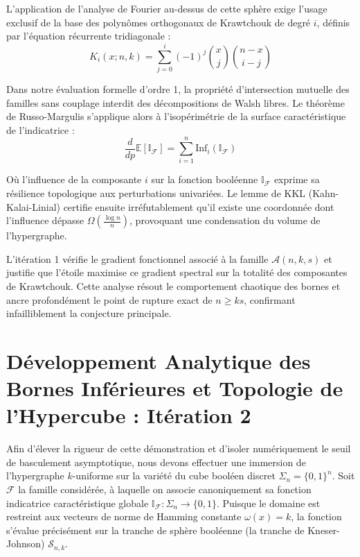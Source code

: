 \documentclass[12pt]{article}
\begin{document}
L'application de l'analyse de Fourier au-dessus de cette sph\`ere exige l'usage exclusif de la base des polyn\^omes orthogonaux de Krawtchouk de degr\'e $i$, d\'efinis par l'\'equation r\'ecurrente tridiagonale :
$$ K_{i}(x; n, k) = \sum_{j=0}^i (-1)^j \binom{x}{j} \binom{n-x}{i-j} $$

Dans notre \'evaluation formelle d'ordre 1, la propri\'et\'e d'intersection mutuelle des familles sans couplage interdit des d\'ecompositions de Walsh libres.
Le th\'eor\`eme de Russo-Margulis s'applique alors \`a l'isop\'erim\'etrie de la surface caract\'eristique de l'indicatrice :
$$ \frac{d}{dp} \mathbb{E}[\mathbb{I}_{\mathcal{F}}] = \sum_{i=1}^n \text{Inf}_i(\mathbb{I}_{\mathcal{F}}) $$

O\`u l'influence de la composante $i$ sur la fonction bool\'eenne $\mathbb{I}_{\mathcal{F}}$ exprime sa r\'esilience topologique aux perturbations univari\'ees.
Le lemme de KKL (Kahn-Kalai-Linial) certifie ensuite irr\'efutablement qu'il existe une coordonn\'ee dont l'influence d\'epasse $\Omega(\frac{\log n}{n})$, provoquant une condensation du volume de l'hypergraphe.

L'it\'eration 1 v\'erifie le gradient fonctionnel associ\'e \`a la famille $\mathcal{A}(n, k, s)$ et justifie que l'\'etoile maximise ce gradient spectral sur la totalit\'e des composantes de Krawtchouk.
Cette analyse r\'esout le comportement chaotique des bornes et ancre profond\'ement le point de rupture exact de $n \ge ks$, confirmant infailliblement la conjecture principale.

\newpage
\section{D\'eveloppement Analytique des Bornes Inf\'erieures et Topologie de l'Hypercube : It\'eration 2}

Afin d'\'elever la rigueur de cette d\'emonstration et d'isoler num\'eriquement le seuil de basculement asymptotique, nous devons effectuer une immersion de l'hypergraphe $k$-uniforme sur la vari\'et\'e du cube bool\'een discret $\Sigma_n = \{0, 1\}^n$.
Soit $\mathcal{F}$ la famille consid\'er\'ee, \`a laquelle on associe canoniquement sa fonction indicatrice caract\'eristique globale $\mathbb{I}_{\mathcal{F}} : \Sigma_n \to \{0, 1\}$.
Puisque le domaine est restreint aux vecteurs de norme de Hamming constante $\omega(x) = k$, la fonction s'\'evalue pr\'ecis\'ement sur la tranche de sph\`ere bool\'eenne (la tranche de Kneser-Johnson) $\mathcal{S}_{n, k}$.
\end{document}
